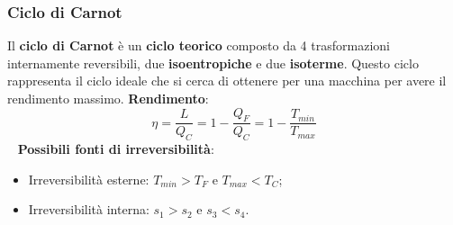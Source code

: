 \subsubsection{Ciclo di Carnot}
Il \textbf{ciclo di Carnot} è un \textbf{ciclo teorico} composto da 4 trasformazioni internamente reversibili, due \textbf{isoentropiche} e due \textbf{isoterme}.\newline
\newline
Questo ciclo rappresenta il ciclo ideale che si cerca di ottenere per una macchina per avere il rendimento massimo.\newline
\newline
\textbf{Rendimento}:
\[
    \eta = \frac{L}{Q_C} = 1- \frac{Q_F}{Q_C} = 1- \frac{T_{min}}{T_{max}}
\]
\ \newline
\textbf{Possibili fonti di irreversibilità}:
\begin{itemize}
    \item Irreversibilità esterne: $T_{min} > T_F$ e $T_{max} < T_C$;
    \item Irreversibilità interna: $s_1 > s_2$ e $s_3 < s_4$.
\end{itemize}
